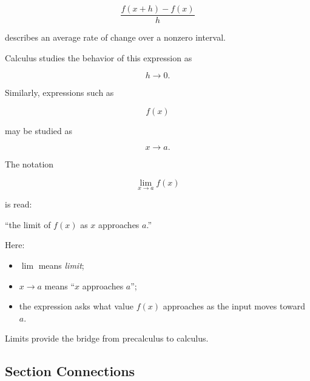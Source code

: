 \[ \frac{f(x+h)-f(x)}{h} \]

describes an average rate of change over a nonzero interval.

Calculus studies the behavior of this expression as

\[ h\to0. \]

Similarly, expressions such as

\[ f(x) \]

may be studied as

\[ x\to a. \]

The notation

\[ \lim_{x\to a}f(x) \]

is read:

``the limit of \(f(x)\) as \(x\) approaches \(a\).''

Here:

\begin{itemize}
    \item \(\lim\) means \emph{limit};
    \item \(x\to a\) means ``\(x\) approaches \(a\)'';
    \item the expression asks what value \(f(x)\) approaches as the input
    moves toward \(a\).
\end{itemize}

Limits provide the bridge from precalculus to calculus.

\begin{center}
\end{center}

\subsection{Section Connections}
\label{subsec:precalculus-connections}

